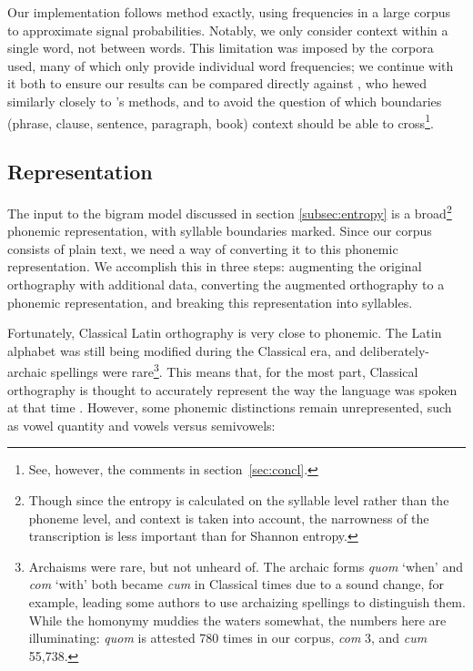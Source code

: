\documentclass[12pt,twoside]{article}
\begin{document}
Our implementation follows  method exactly, using frequencies in a large corpus to approximate signal probabilities. Notably, we only consider context within a single word, not between words. This limitation was imposed by the corpora \citeauthor{oh} used, many of which only provide individual word frequencies; we continue with it both to ensure our results can be compared directly against , who hewed similarly closely to \citeauthor{oh}'s methods, and to avoid the question of which boundaries (phrase, clause, sentence, paragraph, book) context should be able to cross\footnote{See, however, the comments in section~\ref{sec:concl}.}.

\subsection{Representation}
\label{subsec:repr}

The input to the bigram model discussed in section \ref{subsec:entropy} is a broad\footnote{Though since the entropy is calculated on the syllable level rather than the phoneme level, and context is taken into account, the narrowness of the transcription is less important than for Shannon entropy.} phonemic representation, with syllable boundaries marked. Since our corpus consists of plain text, we need a way of converting it to this phonemic representation. We accomplish this in three steps: augmenting the original orthography with additional data, converting the augmented orthography to a phonemic representation, and breaking this representation into syllables.

Fortunately, Classical Latin orthography is very close to phonemic. The Latin alphabet was still being modified during the Classical era, and deliberately-archaic spellings were rare\footnote{Archaisms were rare, but not unheard of. The archaic forms \emph{quom} `when' and \emph{com} `with' both became \emph{cum} in Classical times due to a sound change, for example, leading some authors to use archaizing spellings to distinguish them. While the homonymy muddies the waters somewhat, the numbers here are illuminating: \emph{quom} is attested 780 times in our corpus, \emph{com} 3, and \emph{cum} 55,738.}. This means that, for the most part, Classical orthography is thought to accurately represent the way the language was spoken at that time \citep[9]{allen}. However, some phonemic distinctions remain unrepresented, such as vowel quantity and vowels versus semivowels:

\end{document}
